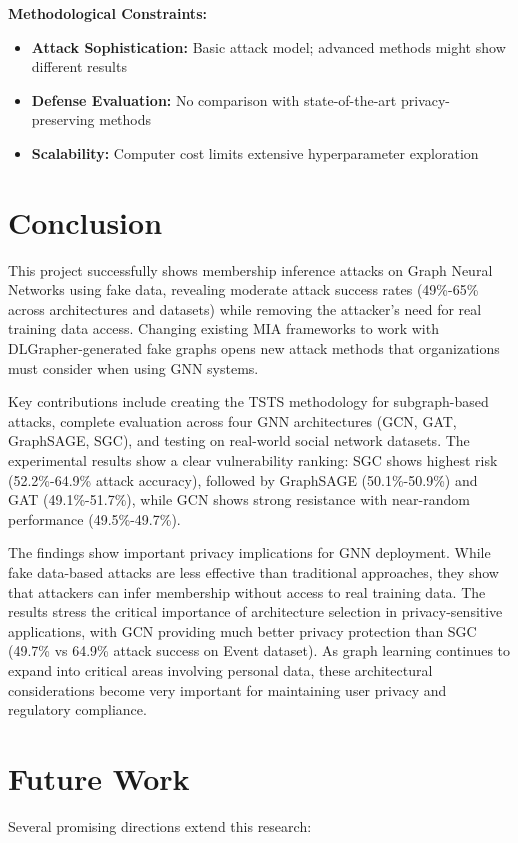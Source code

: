 \documentclass{article}
\begin{document}
\textbf{Methodological Constraints:}
\begin{itemize}
\item \textbf{Attack Sophistication:} Basic attack model; advanced methods might show different results
\item \textbf{Defense Evaluation:} No comparison with state-of-the-art privacy-preserving methods
\item \textbf{Scalability:} Computer cost limits extensive hyperparameter exploration
\end{itemize}

\section{Conclusion}
This project successfully shows membership inference attacks on Graph Neural Networks using fake data, revealing moderate attack success rates (49\%-65\% across architectures and datasets) while removing the attacker's need for real training data access. Changing existing MIA frameworks to work with DLGrapher-generated fake graphs opens new attack methods that organizations must consider when using GNN systems.

Key contributions include creating the TSTS methodology for subgraph-based attacks, complete evaluation across four GNN architectures (GCN, GAT, GraphSAGE, SGC), and testing on real-world social network datasets. The experimental results show a clear vulnerability ranking: SGC shows highest risk (52.2\%-64.9\% attack accuracy), followed by GraphSAGE (50.1\%-50.9\%) and GAT (49.1\%-51.7\%), while GCN shows strong resistance with near-random performance (49.5\%-49.7\%).

The findings show important privacy implications for GNN deployment. While fake data-based attacks are less effective than traditional approaches, they show that attackers can infer membership without access to real training data. The results stress the critical importance of architecture selection in privacy-sensitive applications, with GCN providing much better privacy protection than SGC (49.7\% vs 64.9\% attack success on Event dataset). As graph learning continues to expand into critical areas involving personal data, these architectural considerations become very important for maintaining user privacy and regulatory compliance.

\section{Future Work}
Several promising directions extend this research:
\end{document}
